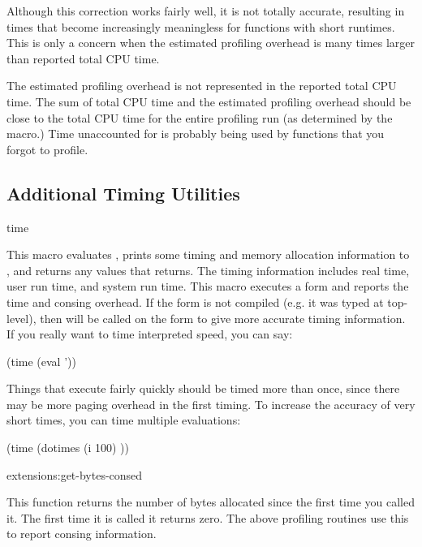 Although this correction works fairly well, it is not totally accurate,
resulting in times that become increasingly meaningless for functions with
short runtimes.  This is only a concern when the estimated profiling overhead
is many times larger than reported total CPU time.

The estimated profiling overhead is not represented in the reported total CPU
time.  The sum of total CPU time and the estimated profiling overhead should be
close to the total CPU time for the entire profiling run (as determined by the
 macro.)  Time unaccounted for is probably being used by functions that
you forgot to profile.

\subsection{Additional Timing Utilities}

\begin{defmac}{}{time}{ }

  This macro evaluates , prints some timing and memory
  allocation information to , and returns any
  values that  returns.  The timing information includes
  real time, user run time, and system run time.  This macro executes
  a form and reports the time and consing overhead.  If the
   form is not compiled (e.g. it was typed at top-level),
  then  will be called on the form to give more accurate
  timing information.  If you really want to time interpreted speed,
  you can say:
\begin{lisp}
(time (eval '))
\end{lisp}
Things that execute fairly quickly should be timed more than once,
since there may be more paging overhead in the first timing.  To
increase the accuracy of very short times, you can time multiple
evaluations:
\begin{lisp}
(time (dotimes (i 100) ))
\end{lisp}
\end{defmac}

\begin{defun}{extensions:}{get-bytes-consed}{}
  
  This function returns the number of bytes allocated since the first
  time you called it.  The first time it is called it returns zero.
  The above profiling routines use this to report consing information.
\end{defun}

